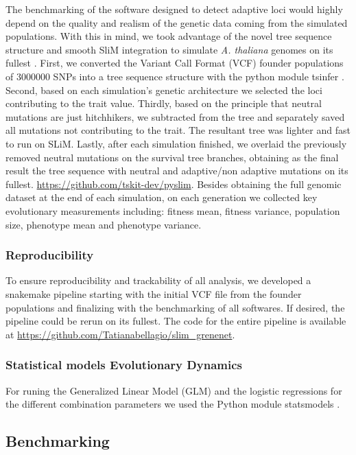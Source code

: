 \documentclass{article}
\begin{document}
The benchmarking of the software designed to detect adaptive loci would highly depend on the quality and realism of the genetic data coming from the simulated populations. With this in mind, we took advantage of the novel tree sequence structure and smooth SliM integration to simulate \textit{A. thaliana} genomes on its fullest \citep{Kelleher2018-jb, Haller2019-lm}. First, we converted the Variant Call Format (VCF) founder populations of 3000000 SNPs  into a tree sequence structure with the python module tsinfer \citep{Kelleher2019-ev}. Second, based on each simulation's genetic architecture we selected the loci contributing to the trait value. Thirdly, based on the principle that neutral mutations are just hitchhikers, we subtracted from the tree and separately saved all mutations not contributing to the trait. The resultant tree was lighter and fast to run on SLiM. Lastly, after each simulation finished, we overlaid the previously removed neutral mutations on the survival tree branches, obtaining as the final result the tree sequence with neutral and adaptive/non adaptive mutations on its fullest. 
\url{https://github.com/tskit-dev/pyslim}. Besides obtaining the full genomic dataset at the end of each simulation, on each generation we collected key evolutionary measurements including: fitness mean, fitness variance, population size, phenotype mean and phenotype variance. 

\subsubsection{Reproducibility}
To ensure reproducibility and trackability of all analysis, we developed a snakemake \citep{Molder2021-ho} pipeline starting with the initial VCF file from the founder populations and finalizing with the benchmarking of all softwares. If desired, the pipeline could be rerun on its fullest. The code for the entire pipeline is available at \url{https://github.com/Tatianabellagio/slim_grenenet}.

\subsubsection{Statistical models Evolutionary Dynamics}
For runing the Generalized Linear Model (GLM) and the logistic regressions for the different combination parameters we used the Python module statsmodels \citep{Seabold2010-ec}. 

\subsection{Benchmarking}
\end{document}

